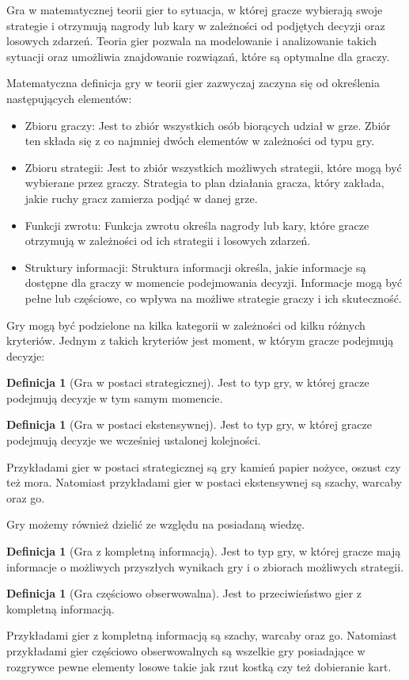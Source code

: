 \documentclass[inzynierska]{pwr_wmat_praca_dyplomowa}
\theoremstyle{plain}
\numberwithin{theorem}{chapter}
\theoremstyle{definition}
\numberwithin{theorem}{chapter}
\newtheorem{definition}[theorem]{Definicja}
\begin{document}
Gra w matematycznej teorii gier to sytuacja, w której gracze wybierają swoje strategie i otrzymują nagrody lub kary w zależności od podjętych decyzji  oraz losowych zdarzeń. Teoria gier pozwala na modelowanie i analizowanie takich sytuacji oraz umożliwia znajdowanie rozwiązań, które są optymalne dla graczy.

Matematyczna definicja gry w teorii gier zazwyczaj zaczyna się od określenia następujących elementów:

\begin{itemize}
	\item Zbioru graczy: Jest to zbiór wszystkich osób biorących udział w grze. Zbiór ten składa się z co najmniej dwóch elementów w zależności od typu gry.
	
	\item Zbioru strategii: Jest to zbiór wszystkich możliwych strategii, które mogą być wybierane przez graczy. Strategia to plan działania gracza, który zakłada, jakie ruchy gracz zamierza podjąć w danej grze.
	
	\item Funkcji zwrotu: Funkcja zwrotu określa nagrody lub kary, które gracze otrzymują w zależności od ich strategii i losowych zdarzeń.
	
	\item Struktury informacji: Struktura informacji określa, jakie informacje są dostępne dla graczy w momencie podejmowania decyzji. Informacje mogą być pełne lub częściowe, co wpływa na możliwe strategie graczy i ich skuteczność.
\end{itemize}

Gry mogą być podzielone na kilka kategorii w zależności od kilku różnych kryteriów. Jednym z takich kryteriów jest moment, w którym gracze podejmują decyzje:

\begin{definition}[Gra w postaci strategicznej]
Jest to typ gry, w której gracze podejmują decyzje w tym samym
momencie.
\end{definition}
\begin{definition}[Gra w postaci ekstensywnej]
	Jest to typ gry, w której gracze podejmują decyzje we wcześniej ustalonej kolejności.
\end{definition}
Przykładami gier w postaci strategicznej są gry kamień papier nożyce, oszust czy też mora. Natomiast przykładami gier w postaci ekstensywnej są szachy, warcaby oraz go.

Gry możemy również dzielić ze względu na posiadaną wiedzę.
\begin{definition}[Gra z kompletną informacją]
	Jest to typ gry, w której gracze mają informacje o możliwych przyszłych wynikach gry i o zbiorach możliwych strategii.
\end{definition}
\begin{definition}[Gra częściowo obserwowalna]
	Jest to przeciwieństwo gier z kompletną informacją.
\end{definition}
Przykładami gier z kompletną informacją są szachy, warcaby oraz go.
Natomiast przykładami gier częściowo obserwowalnych są wszelkie gry posiadające w rozgrywce pewne elementy losowe takie jak rzut kostką czy też dobieranie kart. 
\end{document}
